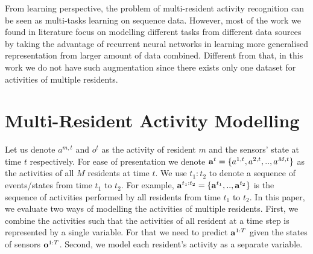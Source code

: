 From learning perspective, the problem of multi-resident activity
recognition can be seen as multi-tasks learning on sequence
data. However, most of the work we found in literature focus on
modelling different tasks from different data sources by taking the
advantage of recurrent neural networks in learning more generalised
representation from larger amount of data combined. Different from
that, in this work we do not have such augmentation since there exists
only one dataset for activities of multiple residents.
\section{Multi-Resident Activity Modelling}
\label{sec:mrar}
Let us denote $a^{m,t}$ and $o^t$ as the activity of resident $m$ and
the sensors' state at time $t$ respectively. For ease of presentation
we denote $\mathbf{a}^t=\{a^{1,t}, a^{2,t}, .. , a^{M,t}\}$ as the
activities of all $M$ residents at time $t$. We use $t_1:t_2$ to
denote a sequence of events/states from time $t_1$ to $t_2$. For
example, $\mathbf{a}^{t_1:t_2}=\{\mathbf{a}^{t_1}, .. , \mathbf{a}^{t_2}\}$ is the
sequence of activities performed by all residents from time $t_1$ to
$t_2$. In this paper, we evaluate two ways of modelling the activities of
multiple residents. First, we combine the activities such that the
activities of all resident at a time step is represented by a single
variable. For that we need to predict $\mathbf{a}^{1:T}$ given the states
of sensors $\mathbf{o}^{1:T}$. Second, we model  each resident's
activity as a separate variable.

